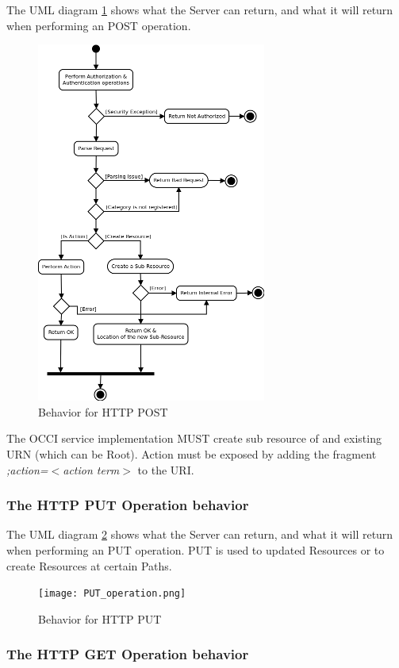 \documentclass[10pt,a4paper]{article}
\begin{document}
The UML diagram \ref{fig:post_operation} shows what the Server can return, and what it will return when performing an POST operation.

\begin{figure}[!hp]
	\centering
	\includegraphics[scale=0.4]{POST_operation.png}
	\caption{Behavior for HTTP POST}
	\label{fig:post_operation}
\end{figure}

The OCCI service implementation MUST create sub resource of and existing URN (which can be Root). Action must be exposed by adding the fragment \emph{;action=$<$action term$>$} to the URI.

\newpage
\subsubsection{The HTTP PUT Operation behavior}

The UML diagram \ref{fig:put_operation} shows what the Server can return, and what it will return when performing an PUT operation. PUT is used to updated Resources or to create Resources at certain Paths.

\begin{figure}[!h]
	\centering
	\texttt{[image: PUT\_operation.png]}
	\caption{Behavior for HTTP PUT}
	\label{fig:put_operation}
\end{figure}

\newpage
\subsubsection{The HTTP GET Operation behavior}
\end{document}
